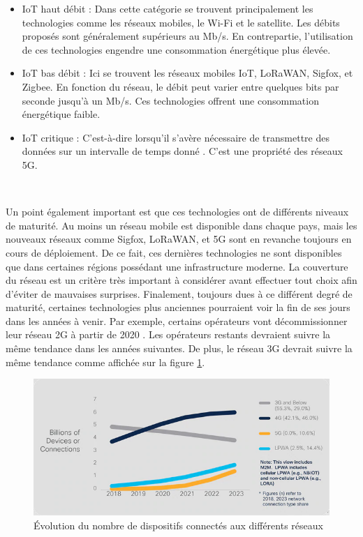 \begin{itemize}
  \item IoT haut débit : Dans cette catégorie se trouvent principalement les technologies comme les réseaux mobiles, le Wi-Fi et le satellite. Les débits proposés sont généralement supérieurs au Mb/s. En contrepartie, l'utilisation de ces technologies engendre une consommation énergétique plus élevée.
  \item IoT bas débit : Ici se trouvent les réseaux mobiles IoT, LoRaWAN, Sigfox, et Zigbee. En fonction du réseau, le débit peut varier entre quelques bits par seconde jusqu'à un Mb/s. Ces technologies offrent une consommation énergétique faible.
  \item IoT critique : C'est-à-dire lorsqu'il s'avère nécessaire de transmettre des données sur un intervalle de temps donné \cite{orange_iot}. C'est une propriété des réseaux 5G.
\end{itemize}

~

\noindent
Un point également important est que ces technologies ont de différents niveaux de maturité. Au moins un réseau mobile est disponible dans chaque pays, mais les nouveaux réseaux comme Sigfox, LoRaWAN, et 5G sont en revanche toujours en cours de déploiement. De ce fait, ces dernières technologies ne sont disponibles que dans certaines régions possédant une infrastructure moderne. La couverture du réseau est un critère très important à considérer avant effectuer tout choix afin d’éviter de mauvaises surprises.
Finalement, toujours dues à ce différent degré de maturité, certaines technologies plus anciennes pourraient voir la fin de ses jours dans les années à venir. Par exemple, certains opérateurs vont décommissionner leur réseau 2G à partir de 2020 \cite{swisscom_2g}. Les opérateurs restants devraient suivre la même tendance dans les années suivantes. De plus, le réseau 3G devrait suivre la même tendance comme affichée sur la figure \ref{fig:evo_network}.

\begin{figure}[ht]
  \includegraphics[width=\textwidth]{img/state_of_the_art/network_evolution.png}
  \caption{Évolution du nombre de dispositifs connectés aux différents réseaux \cite{report_cisco}}
  \label{fig:evo_network}
\end{figure}



